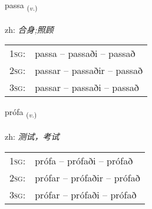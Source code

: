 \documentclass[frontgrid, backgrid]{flacards}\usepackage[]{graphicx}\usepackage[]{color}
\begin{document}
\renewcommand{\blhead}{\vskip5pt {\small\bfseries\footnotesize Sagnorð | 动词 }}
\renewcommand{\bcfoot}{\vskip5pt \hspace{2pt}{\small\bfseries\footnotesize 2K}}


{passa \small{\textsubscript{(\textit{v.})}} \\[1ex] %
\textphonetic{[pʰasa]} \\
zh: \emph{合身;照顾} \\  [2ex]
\renewcommand*{\arraystretch}{0.8}
\begin{tabular}{p{1cm}l}
\textsc{1sg}: & passa -- passaði -- passað \\ 
\textsc{2sg}: & passar -- passaðir -- passað \\ 
\textsc{3sg}: & passar -- passaði -- passað \\ 
\end{tabular}
}

\renewcommand{\flhead}{\vskip5pt \fboxsep=0pt {\small\bfseries\footnotesize Sagnorð | 动词}}
\renewcommand{\fcfoot}{\vskip5pt \fboxsep=0pt \hspace{2pt}{\small\bfseries\footnotesize 2K}}

\renewcommand{\blhead}{\vskip5pt {\small\bfseries\footnotesize Sagnorð | 动词 }}
\renewcommand{\bcfoot}{\vskip5pt \hspace{2pt}{\small\bfseries\footnotesize 2K}}


{prófa \small{\textsubscript{(\textit{v.})}} \\[1ex] %
\textphonetic{[pʰrouːva]} \\
zh: \emph{测试，考试} \\  [2ex]
\renewcommand*{\arraystretch}{0.8}
\begin{tabular}{p{1cm}l}
\textsc{1sg}: & prófa -- prófaði -- prófað \\ 
\textsc{2sg}: & prófar -- prófaðir -- prófað \\ 
\textsc{3sg}: & prófar -- prófaði -- prófað \\ 
\end{tabular}
}
\end{document}
